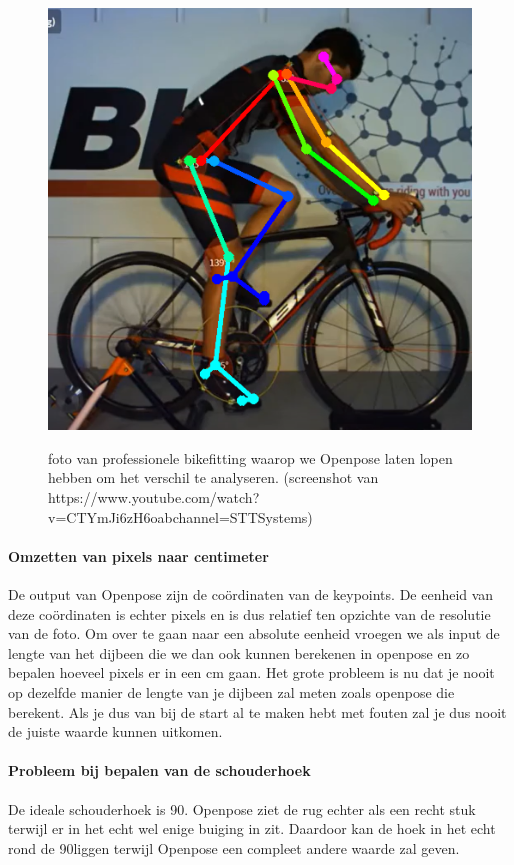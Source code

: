 \documentclass[a4paper,twoside,kulak]{kulakreport}
\begin{document}
\begin{figure}[H]
	\centering
	\includegraphics[width= \textwidth]{prof_bikefit}
	\label{proffessionele_bikefit}
	\caption{foto van professionele bikefitting waarop we Openpose laten lopen hebben om het verschil te analyseren. (screenshot van https://www.youtube.com/watch?v=CTYmJi6zH6oabchannel=STTSystems)}
\end{figure}

\paragraph{Omzetten van pixels naar centimeter}
De output van Openpose zijn de coördinaten van de keypoints. De eenheid van deze coördinaten is echter pixels en is dus relatief ten opzichte van de resolutie van de foto. Om over te gaan naar een absolute eenheid vroegen we als input de lengte van het dijbeen die we dan ook kunnen berekenen in openpose en zo bepalen hoeveel pixels er in een \si{cm} gaan. Het grote probleem is nu dat je nooit op dezelfde manier de lengte van je dijbeen zal meten zoals openpose die berekent. Als je dus van bij de start al te maken hebt met fouten zal je dus nooit de juiste waarde kunnen uitkomen.

\paragraph{Probleem bij bepalen van de schouderhoek}
De ideale schouderhoek is 90\degree. Openpose ziet de rug echter als een recht stuk terwijl er in het echt wel enige buiging in zit. Daardoor kan de hoek in het echt rond de 90\degree liggen terwijl Openpose een compleet andere waarde zal geven.
\end{document}
